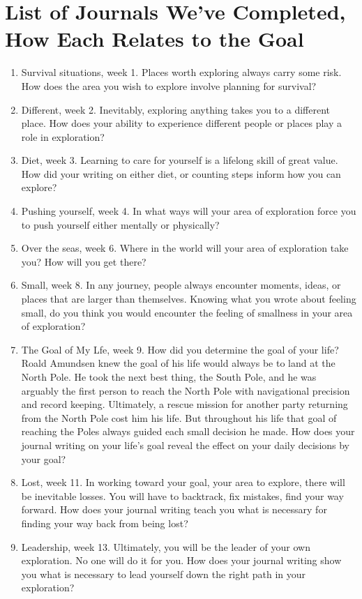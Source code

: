 \documentclass[10pt]{article}
\begin{document}
\section{List of Journals We've Completed, How Each Relates to the Goal}
\begin{enumerate}
\item Survival situations, week 1.  Places worth exploring always carry some risk.  How does the area you wish to explore involve planning for survival?
\item Different, week 2.  Inevitably, exploring anything takes you to a different place.  How does your ability to experience different people or places play a role in exploration?
\item Diet, week 3.  Learning to care for yourself is a lifelong skill of great value.  How did your writing on either diet, or counting steps inform how you can explore?
\item Pushing yourself, week 4.  In what ways will your area of exploration force you to push yourself either mentally or physically?
\item Over the seas, week 6.  Where in the world will your area of exploration take you?  How will you get there?
\item Small, week 8.  In any journey, people always encounter moments, ideas, or places that are larger than themselves.  Knowing what you wrote about feeling small, do you think you would encounter the feeling of smallness in your area of exploration?
\item The Goal of My Lfe, week 9.  How did you determine the goal of your life?  Roald Amundsen knew the goal of his life would always be to land at the North Pole.  He took the next best thing, the South Pole, and he was arguably the first person to reach the North Pole with navigational precision and record keeping.  Ultimately, a rescue mission for another party returning from the North Pole cost him his life.  But throughout his life that goal of reaching the Poles always guided each small decision he made.  How does your journal writing on your life's goal reveal the effect on your daily decisions by your goal?
\item Lost, week 11.  In working toward your goal, your area to explore, there will be inevitable losses.  You will have to backtrack, fix mistakes, find your way forward.  How does your journal writing teach you what is necessary for finding your way back from being lost?
\item Leadership, week 13.  Ultimately, you will be the leader of your own exploration.  No one will do it for you.  How does your journal writing show you what is necessary to lead yourself down the right path in your exploration?
\end{enumerate}
\end{document}
